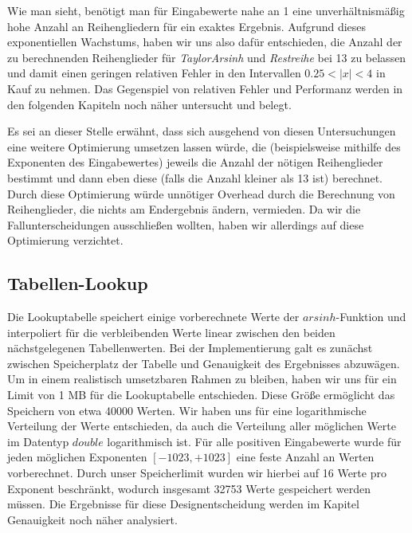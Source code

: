\documentclass[course=erap] {aspdoc}
\begin{document}
     Wie man sieht, benötigt man für Eingabewerte nahe an 1 eine unverhältnismäßig hohe Anzahl an Reihengliedern für ein exaktes Ergebnis. Aufgrund dieses exponentiellen Wachstums, haben wir uns also dafür entschieden, die Anzahl der zu berechnenden Reihenglieder für \textit{TaylorArsinh} und \textit{Restreihe} bei 13 zu belassen und damit einen geringen relativen Fehler in den Intervallen $0.25<|x|<4$ in Kauf zu nehmen. 
     Das Gegenspiel von relativen Fehler und Performanz werden in den folgenden Kapiteln noch näher untersucht und belegt.
     
     Es sei an dieser Stelle erwähnt, dass sich ausgehend von diesen Untersuchungen eine weitere Optimierung umsetzen lassen würde, die (beispielsweise mithilfe des Exponenten des Eingabewertes) jeweils die Anzahl der nötigen Reihenglieder bestimmt und dann eben diese (falls die Anzahl kleiner als 13 ist) berechnet. Durch diese Optimierung würde unnötiger Overhead durch die Berechnung von Reihenglieder, die nichts am Endergebnis ändern, vermieden. Da wir die Fallunterscheidungen ausschließen wollten, haben wir allerdings auf diese Optimierung verzichtet.
 
 
     
 
     
     \subsection{Tabellen-Lookup}
     Die Lookuptabelle speichert einige vorberechnete Werte der $arsinh$-Funktion und interpoliert für die verbleibenden Werte linear zwischen den beiden nächstgelegenen Tabellenwerten.
     Bei der Implementierung galt es zunächst zwischen Speicherplatz der Tabelle und Genauigkeit des Ergebnisses abzuwägen. Um in einem realistisch umsetzbaren Rahmen zu bleiben, haben wir uns für ein Limit von 1 MB für die Lookuptabelle entschieden. Diese Größe ermöglicht das Speichern von etwa 40000 Werten. Wir haben uns für eine logarithmische Verteilung der Werte entschieden, da auch die Verteilung aller möglichen Werte im Datentyp $double$ logarithmisch ist. Für alle positiven Eingabewerte wurde für jeden möglichen Exponenten $[-1023, +1023]$ eine feste Anzahl an Werten vorberechnet. Durch unser Speicherlimit wurden wir hierbei auf 16 Werte pro Exponent beschränkt, wodurch insgesamt 32753 Werte gespeichert werden müssen. Die Ergebnisse für diese Designentscheidung werden im Kapitel Genauigkeit noch näher analysiert.
     
\end{document}
